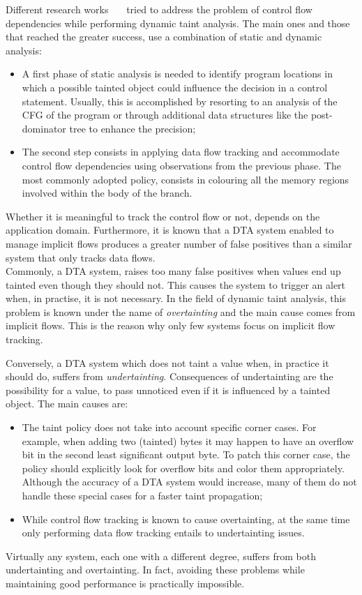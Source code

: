 \documentclass[LaM,binding=0.6cm]{sapthesis}
\begin{document}
Different research works~\cite{graa2012detecting}~\cite{clause2007dytan}~\cite{chen2011dynamic} tried to address the problem of control flow dependencies while performing dynamic taint analysis. The main ones and those that reached the greater success, use a combination of static and dynamic analysis:
\begin{itemize}
\item A first phase of static analysis is needed to identify program locations in which a possible tainted object could influence the decision in a control statement. Usually, this is accomplished by resorting to an analysis of the CFG of the program or through additional data structures like the post-dominator tree to enhance the precision;
\item The second step consists in applying data flow tracking and accommodate control flow dependencies using observations from the previous phase. The most commonly adopted policy, consists in colouring all the memory regions involved within the body of the branch.
\end{itemize}
Whether it is meaningful to track the control flow or not, depends on the application domain. Furthermore, it is known that a DTA system enabled to manage implicit flows produces a greater number of false positives than a similar system that only tracks data flows.\\

Commonly, a DTA system, raises too many false positives when values end up tainted even though they should not. This causes the system to trigger an alert when, in practise, it is not necessary. In the field of dynamic taint analysis, this problem is known under the name of \textit{overtainting} and the main cause comes from implicit flows. This is the reason why only few systems focus on implicit flow tracking.

Conversely, a DTA system which does not taint a value when, in practice it should do, suffers from \textit{undertainting}. Consequences of undertainting are the possibility for a value, to pass unnoticed even if it is influenced by a tainted object. The main causes are:
\begin{itemize}
\item The taint policy does not take into account specific corner cases. For example, when adding two (tainted) bytes it may happen to have an overflow bit in the second least significant output byte. To patch this corner case, the policy should explicitly look for overflow bits and color them appropriately. Although the accuracy of a DTA system would increase, many of them do not handle these special cases for a faster taint propagation;
\item While control flow tracking is known to cause overtainting, at the same time only performing data flow tracking entails to undertainting issues.
\end{itemize}
Virtually any system, each one with a different degree, suffers from both undertainting and overtainting. In fact, avoiding these problems while maintaining good performance is practically impossible.
\end{document}

